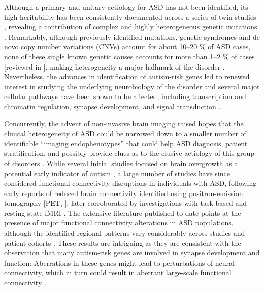 Although a primary and unitary aetiology for ASD has not been identified, its
high heritability has been consistently documented across a series of twin
studies \parencite{tick2016}, revealing a contribution of complex and highly
heterogeneous genetic mutations \parencite{geschwind2009, geschwind2015,
sanders2015}. Remarkably, although previously identified mutations, genetic
syndromes and de novo copy number variations (CNVs) account for about 10–20 \%
of ASD cases, none of these single known genetic causes accounts for more than
1–2 \% of cases [reviewed in \parencite{abrahams2008}], making heterogeneity a
major hallmark of the disorder \parencite{betancur2011}. Nevertheless, the
advances in identification of autism-risk genes led to renewed interest in
studying the underlying neurobiology of the disorder and several major cellular
pathways have been shown to be affected, including transcription and chromatin
regulation, synapse development, and signal transduction
\parencite{sanders2015b, kleijer2017}. 

Concurrently, the advent of non-invasive brain imaging raised hopes that the
clinical heterogeneity of ASD could be narrowed down to a smaller number of
identifiable ``imaging endophenotypes'' that could help ASD diagnosis, patient
stratification, and possibly provide clues as to the elusive aetiology of this
group of disorders \parencite{geschwind2015, gottesman2003}. While several
initial studies focused on brain overgrowth as a potential early indicator of
autism \parencite{courchesne2002, lange2015, ecker2017}, a large number of
studies have since considered functional connectivity disruptions in individuals
with ASD, following early reports of reduced brain connectivity identified using
positron-emission tomography [PET, \parencite{horwitz1988}], later corroborated
by investigations with task-based \parencite{just2004} and resting-state fMRI
\parencite{assaf2010, cherkassky2006, kennedy2008}. The extensive literature
published to date points at the presence of major functional connectivity
alterations in ASD populations, although the identified regional patterns vary
considerably across studies and patient cohorts \parencite{ameis2015,
bernhardt2016, ecker2014, ecker2015, kana2011, muller2014, vasa2016}. These
results are intriguing as they are consistent with the observation that many
autism-risk genes are involved in synapse development and function: Aberrations
in these genes might lead to perturbations of neural connectivity, which in turn
could result in aberrant large-scale functional connectivity \parencite{ecker2017}. 

